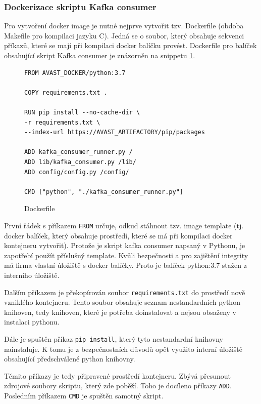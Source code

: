 \documentclass[thesis=M,czech,hidelinks]{FITthesis}[2013/05/06]
\begin{document}
\subsubsection{Dockerizace skriptu Kafka consumer} 
Pro vytvoření docker image je nutné nejprve vytvořit tzv. Dockerfile (obdoba Makefile pro kompilaci jazyku C). Jedná se o soubor, který obsahuje sekvenci příkazů, které se mají při kompilaci docker balíčku provést. Dockerfile pro balíček obsahující skript Kafka consumer je znázorněn na snippetu \ref{snip:docker}.

\begin{figure}[h]               
	\begin{verbatim}
FROM AVAST_DOCKER/python:3.7

COPY requirements.txt .

RUN pip install --no-cache-dir \
-r requirements.txt \
--index-url https://AVAST_ARTIFACTORY/pip/packages

ADD kafka_consumer_runner.py /
ADD lib/kafka_consumer.py /lib/
ADD config/config.py /config/

CMD ["python", "./kafka_consumer_runner.py"]
	\end{verbatim}      
	\caption{Dockerfile}
	\label{snip:docker}
\end{figure}

První řádek s příkazem \texttt{FROM} určuje, odkud stáhnout tzv. image template (tj. docker balíček, který obsahuje prostředí, které se má při kompilaci docker kontejneru vytvořit). Protože je skript kafka consumer napsaný v Pythonu, je zapotřebí použít příslušný template. Kvůli bezpečnosti a pro zajištění integrity má firma vlastní úložiště s docker balíčky. Proto je balíček python:3.7 stažen z interního úložiště.

Dalším příkazem je překopírován soubor \texttt{requirements.txt} do prostředí nově vzniklého kontejneru. Tento soubor obsahuje seznam nestandardních python knihoven, tedy knihoven, které je potřeba doinstalovat a nejsou obsaženy v instalaci pythonu.

Dále je spuštěn příkaz \texttt{pip install}, který tyto nestandardní knihovny nainstaluje. K tomu je z bezpečnostních důvodů opět využito interní úložiště obsahující předschválené python knihovny.

Těmito příkazy je tedy připravené prostředí kontejneru. Zbývá přesunout zdrojové soubory skriptu, který zde poběží. Toho je docíleno příkazy \texttt{ADD}. Posledním příkazem \texttt{CMD} je spuštěn samotný skript.
\end{document}
